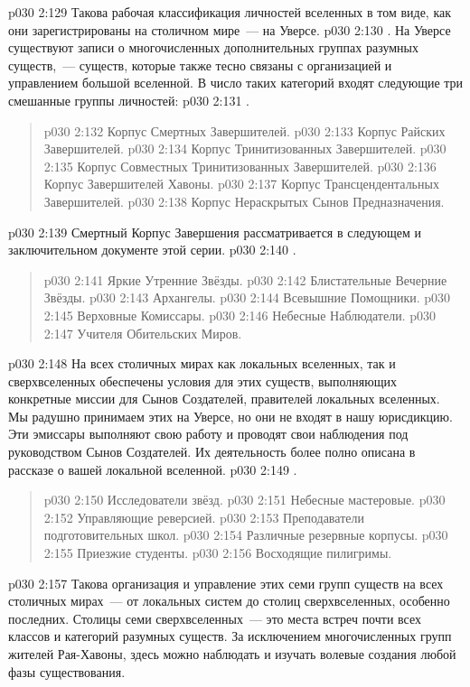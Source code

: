 \vs p030 2:129 \pc Такова рабочая классификация личностей вселенных в том виде, как они зарегистрированы на столичном мире~--- на Уверсе.
\vs p030 2:130 \pc {}. На Уверсе существуют записи о многочисленных дополнительных группах разумных существ,~--- существ, которые также тесно связаны с организацией и управлением большой вселенной. В число таких категорий входят следующие три смешанные группы личностей:
\vs p030 2:131 .
\begin{quote}
\vs p030 2:132 Корпус Смертных Завершителей.
\vs p030 2:133 Корпус Райских Завершителей.
\vs p030 2:134 Корпус Тринитизованных Завершителей.
\vs p030 2:135 Корпус Совместных Тринитизованных Завершителей.
\vs p030 2:136 Корпус Завершителей Хавоны.
\vs p030 2:137 Корпус Трансцендентальных Завершителей.
\vs p030 2:138 Корпус Нераскрытых Сынов Предназначения.
\end{quote}
\vs p030 2:139 \pc Смертный Корпус Завершения рассматривается в следующем и заключительном документе этой серии.
\vs p030 2:140 .
\begin{quote}
\vs p030 2:141 Яркие Утренние Звёзды.
\vs p030 2:142 Блистательные Вечерние Звёзды.
\vs p030 2:143 Архангелы.
\vs p030 2:144 Всевышние Помощники.
\vs p030 2:145 Верховные Комиссары.
\vs p030 2:146 Небесные Наблюдатели.
\vs p030 2:147 Учителя Обительских Миров.
\end{quote}
\vs p030 2:148 \pc На всех столичных мирах как локальных вселенных, так и сверхвселенных обеспечены условия для этих существ, выполняющих конкретные миссии для Сынов Создателей, правителей локальных вселенных. Мы радушно принимаем этих  на Уверсе, но они не входят в нашу юрисдикцию. Эти эмиссары выполняют свою работу и проводят свои наблюдения под руководством Сынов Создателей. Их деятельность более полно описана в рассказе о вашей локальной вселенной.
\vs p030 2:149 .
\begin{quote}
\vs p030 2:150 Исследователи звёзд.
\vs p030 2:151 Небесные мастеровые.
\vs p030 2:152 Управляющие реверсией.
\vs p030 2:153 Преподаватели подготовительных школ.
\vs p030 2:154 Различные резервные корпусы.
\vs p030 2:155 Приезжие студенты.
\vs p030 2:156 Восходящие пилигримы.
\end{quote}
\vs p030 2:157 \pc Такова организация и управление этих семи групп существ на всех столичных мирах~--- от локальных систем до столиц сверхвселенных, особенно последних. Столицы семи сверхвселенных~--- это места встреч почти всех классов и категорий разумных существ. За исключением многочисленных групп жителей Рая\hyp{}Хавоны, здесь можно наблюдать и изучать волевые создания любой фазы существования.
